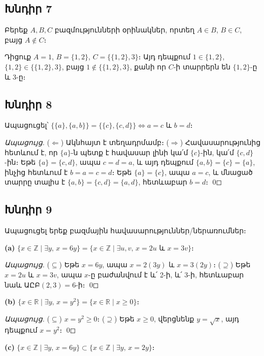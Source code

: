 \subsection*{Խնդիր 7}
Բերեք $A, B, C$ բազմությունների օրինակներ, որտեղ $A \in B$, $B \in C$, բայց $A \notin C$։

Դիցուք $A = 1$, $B = \{1,2\}$, $C = \{\{1,2\},3\}$։
Այդ դեպքում $1 \in \{1,2\}$, $\{1,2\} \in \{\{1,2\},3\}$, բայց $1 \notin \{\{1,2\},3\}$, քանի որ $C$-ի տարրերն են $\{1,2\}$-ը և $3$-ը։

\subsection*{Խնդիր 8}
Ապացուցել՝ $\{\{a\},\{a,b\}\} = \{\{c\},\{c,d\}\} \iff a=c$ և $b=d$։

\textit{Ապացույց.}
($\Leftarrow$) Ակնհայտ է տեղադրմամբ։
($\Rightarrow$) Հավասարությունից հետևում է, որ $\{a\}$-ն պետք է հավասար լինի կա՛մ $\{c\}$-ին, կա՛մ $\{c,d\}$-ին։
Եթե $\{a\} = \{c,d\}$, ապա $c = d = a$, և այդ դեպքում $\{a,b\} = \{c\} = \{a\}$, ինչից հետևում է $b = a = c = d$։
Եթե $\{a\} = \{c\}$, ապա $a = c$, և մնացած տարրը տալիս է $\{a,b\} = \{c,d\} = \{a,d\}$, հետևաբար $b = d$։ \qed

\subsection*{Խնդիր 9}
Ապացուցել երեք բազմային հավասարություններ/ներառումներ։

\textbf{(a)} $\{x \in \mathbb{Z} \mid \exists y,\, x = 6y\} = \{x \in \mathbb{Z} \mid \exists u,v,\, x = 2u \text{ և } x = 3v\}$։

\textit{Ապացույց.} ($\subseteq$) Եթե $x = 6y$, ապա $x = 2(3y)$ և $x = 3(2y)$։
($\supseteq$) Եթե $x = 2u$ և $x = 3v$, ապա $x$-ը բաժանվում է և՛ 2-ի, և՛ 3-ի, հետևաբար նաև $\text{ԱԸԲ}(2,3) = 6$-ի։ \qed

\textbf{(b)} $\{x \in \mathbb{R} \mid \exists y,\, x = y^2\} = \{x \in \mathbb{R} \mid x \ge 0\}$։

\textit{Ապացույց.} ($\subseteq$) $x = y^2 \ge 0$։
($\supseteq$) Եթե $x \ge 0$, վերցնենք $y = \sqrt{x}$, այդ դեպքում $x = y^2$։ \qed

\textbf{(c)} $\{x \in \mathbb{Z} \mid \exists y,\, x = 6y\} \subset \{x \in \mathbb{Z} \mid \exists y,\, x = 2y\}$։

